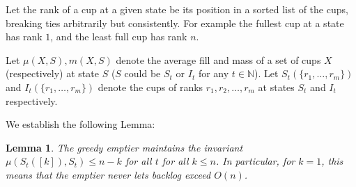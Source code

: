 \documentclass[twocolumn]{article}[11pt]
\newtheorem{lemma}{Lemma}
\begin{document}
Let the rank of a cup at a given state be its position in a sorted list of the
cups, breaking ties arbitrarily but consistently. For example the fullest cup
at a state has rank $1$, and the least full cup has rank $n$.

Let $\mu(X, S), m(X,S)$ denote the average fill and mass of a set of cups $X$
(respectively) at state $S$ ($S$ could be $S_t$ or $I_t$ for any $t\in\mathbb{N}$).
Let $S_t(\{r_1, \ldots, r_m\})$ and $I_t(\{r_1,\ldots, r_m\})$ denote the cups
of ranks $r_1, r_2, \ldots, r_m$ at states $S_t$ and $I_t$ respectively.

We establish the following Lemma:
\begin{lemma}
  The greedy emptier maintains the invariant $\mu(S_t([k]), S_t) \le n-k$ for all $t$ for all $k \le n$.
  In particular, for $k=1$, this means that the emptier never lets backlog exceed $O(n)$.
\end{lemma}
\end{document}
